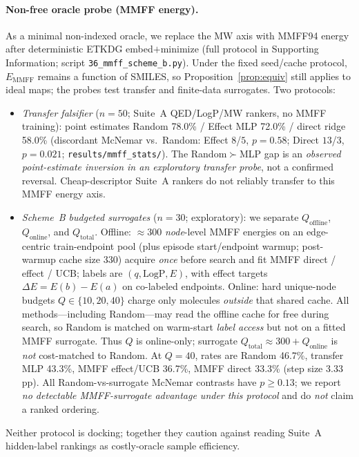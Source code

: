 \documentclass[journal=jcisd8,manuscript=article,email=false]{achemso}
\begin{document}
\paragraph{Non-free oracle probe (MMFF energy).}
As a minimal non-indexed oracle, we replace the MW axis with MMFF94 energy after deterministic ETKDG embed$+$minimize (full protocol in Supporting Information; script \texttt{36\_mmff\_scheme\_b.py}). Under the fixed seed/cache protocol, $E_{\mathrm{MMFF}}$ remains a function of SMILES, so Proposition~\ref{prop:equiv} still applies to ideal maps; the probes test transfer and finite-data surrogates. Two protocols:
\begin{itemize}
  \item \emph{Transfer falsifier} ($n{=}50$; Suite~A QED/LogP/MW rankers, no MMFF training): point estimates Random 78.0\% / Effect MLP 72.0\% / direct ridge 58.0\% (discordant McNemar vs.\ Random: Effect $8$/$5$, $p{=}0.58$; Direct $13$/$3$, $p{=}0.021$; \texttt{results/mmff\_stats/}). The Random$\succ$MLP gap is an \emph{observed point-estimate inversion in an exploratory transfer probe}, not a confirmed reversal. Cheap-descriptor Suite~A rankers do not reliably transfer to this MMFF energy axis.
  \item \emph{Scheme~B budgeted surrogates} ($n{=}30$; exploratory): we separate $Q_{\mathrm{offline}}$, $Q_{\mathrm{online}}$, and $Q_{\mathrm{total}}$. Offline: $\approx$300 \emph{node}-level MMFF energies on an edge-centric train-endpoint pool (plus episode start/endpoint warmup; post-warmup cache size 330) acquire \emph{once} before search and fit MMFF direct / effect / UCB; labels are $(q,\mathrm{LogP},E)$, with effect targets $\Delta E{=}E(b){-}E(a)$ on co-labeled endpoints. Online: hard unique-node budgets $Q{\in}\{10,20,40\}$ charge only molecules \emph{outside} that shared cache. All methods---including Random---may read the offline cache for free during search, so Random is matched on warm-start \emph{label access} but not on a fitted MMFF surrogate. Thus $Q$ is online-only; surrogate $Q_{\mathrm{total}}{\approx}300{+}Q_{\mathrm{online}}$ is \emph{not} cost-matched to Random. At $Q{=}40$, rates are Random 46.7\%, transfer MLP 43.3\%, MMFF effect/UCB 36.7\%, MMFF direct 33.3\% (step size $3.33$pp). All Random-vs-surrogate McNemar contrasts have $p{\ge}0.13$; we report \emph{no detectable MMFF-surrogate advantage under this protocol} and do \emph{not} claim a ranked ordering.
\end{itemize}
Neither protocol is docking; together they caution against reading Suite~A hidden-label rankings as costly-oracle sample efficiency.
\end{document}
